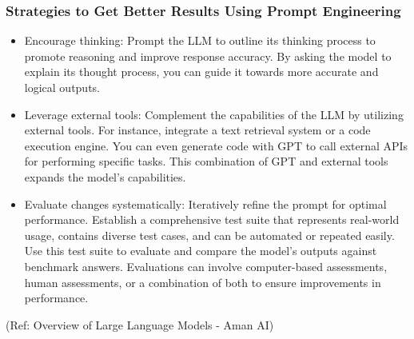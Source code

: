 \begin{frame}[fragile]\frametitle{Strategies to Get Better Results Using Prompt Engineering}

\begin{itemize}
\item Encourage thinking: Prompt the LLM to outline its thinking process to promote reasoning and improve response accuracy. By asking the model to explain its thought process, you can guide it towards more accurate and logical outputs.
\item Leverage external tools: Complement the capabilities of the LLM by utilizing external tools. For instance, integrate a text retrieval system or a code execution engine. You can even generate code with GPT to call external APIs for performing specific tasks. This combination of GPT and external tools expands the model's capabilities.
\item Evaluate changes systematically: Iteratively refine the prompt for optimal performance. Establish a comprehensive test suite that represents real-world usage, contains diverse test cases, and can be automated or repeated easily. Use this test suite to evaluate and compare the model's outputs against benchmark answers. Evaluations can involve computer-based assessments, human assessments, or a combination of both to ensure improvements in performance.
\end{itemize}

{\tiny (Ref: Overview of Large Language Models - Aman AI)}

\end{frame}

